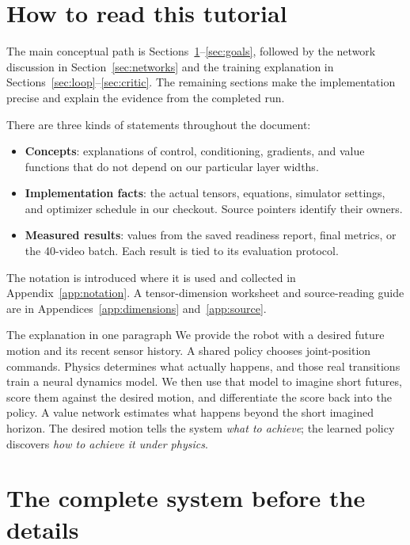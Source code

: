\documentclass[11pt,a4paper]{article}
\begin{document}
\section*{How to read this tutorial}
The main conceptual path is Sections~\ref{sec:overview}--\ref{sec:goals}, followed
by the network discussion in Section~\ref{sec:networks} and the training explanation
in Sections~\ref{sec:loop}--\ref{sec:critic}. The remaining sections make the
implementation precise and explain the evidence from the completed run.

There are three kinds of statements throughout the document:
\begin{itemize}
\item \textbf{Concepts}: explanations of control, conditioning, gradients, and value
functions that do not depend on our particular layer widths.
\item \textbf{Implementation facts}: the actual tensors, equations, simulator settings,
and optimizer schedule in our checkout. Source pointers identify their owners.
\item \textbf{Measured results}: values from the saved readiness report, final metrics,
or the 40-video batch. Each result is tied to its evaluation protocol.
\end{itemize}
The notation is introduced where it is used and collected in
Appendix~\ref{app:notation}. A tensor-dimension worksheet and source-reading guide
are in Appendices~\ref{app:dimensions} and~\ref{app:source}.

\begin{idea}{The explanation in one paragraph}
We provide the robot with a desired future motion and its recent sensor history.
A shared policy chooses joint-position commands. Physics determines what actually
happens, and those real transitions train a neural dynamics model. We then use
that model to imagine short futures, score them against the desired motion, and
differentiate the score back into the policy. A value network estimates what
happens beyond the short imagined horizon. The desired motion tells the system
\emph{what to achieve}; the learned policy discovers \emph{how to achieve it under physics}.
\end{idea}

\section{The complete system before the details}\label{sec:overview}
\end{document}
